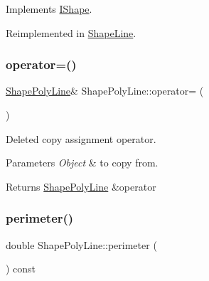Implements \mbox{\hyperlink{class_i_shape_a3d23494cd34e658cc6b39a2e2db0b7fe}{I\+Shape}}.



Reimplemented in \mbox{\hyperlink{class_shape_line_a5b6d9bcf7ed64ab2454d5efa66486ee9}{Shape\+Line}}.

\mbox{\label{class_shape_poly_line_a57631de758dda4361bc5c8317ae88a85}} 
\subsubsection{\texorpdfstring{operator=()}{operator=()}}
{\footnotesize\ttfamily \mbox{\hyperlink{class_shape_poly_line}{Shape\+Poly\+Line}}\& Shape\+Poly\+Line\+::operator= (\begin{DoxyParamCaption}\item[{const \mbox{\hyperlink{class_shape_poly_line}{Shape\+Poly\+Line}} \&}]{ }\end{DoxyParamCaption})\hspace{0.3cm}{\ttfamily [delete]}}



Deleted copy assignment operator. 


\begin{DoxyParams}{Parameters}
{\em Object} & to copy from. \\
\hline
\end{DoxyParams}
\begin{DoxyReturn}{Returns}
\mbox{\hyperlink{class_shape_poly_line}{Shape\+Poly\+Line}} \&operator 
\end{DoxyReturn}
\mbox{\label{class_shape_poly_line_a3d6664ada9c9dd883303a3dcb63d6188}} 
\subsubsection{\texorpdfstring{perimeter()}{perimeter()}}
{\footnotesize\ttfamily double Shape\+Poly\+Line\+::perimeter (\begin{DoxyParamCaption}{ }\end{DoxyParamCaption}) const\hspace{0.3cm}{\ttfamily [virtual]}}



